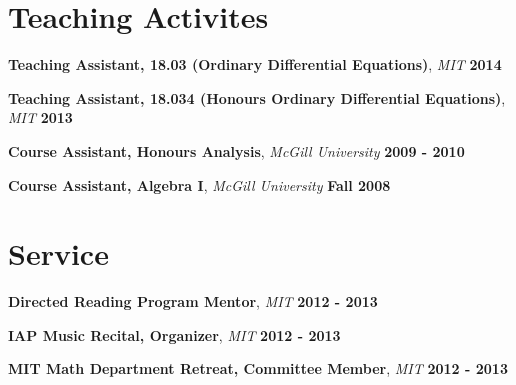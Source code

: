 \documentclass[margin,line]{resume}
\begin{document}
\begin{resume}
      
         \section{\mysidestyle Teaching Activites}
 \textbf{Teaching Assistant, 18.03 (Ordinary Differential Equations)}, \textsl{MIT} \hfill \textbf{2014}
    
    \vspace{-2mm}
    \textbf{Teaching Assistant, 18.034 (Honours Ordinary Differential Equations)}, \textsl{MIT} \hfill \textbf{2013}
    
    \vspace{-2mm}
         \textbf{Course Assistant, Honours Analysis},     \textsl{McGill University} \hfill \textbf{2009 - 2010}

\vspace{-2mm}
\textbf{Course Assistant, Algebra I},    \textsl{McGill University}  \hfill \textbf{Fall 2008}

\vspace{2mm}


   \section{\mysidestyle Service}

    \textbf{Directed Reading Program Mentor}, \textsl{MIT} \hfill \textbf{2012 - 2013}

\vspace{-2mm}
         \textbf{IAP Music Recital, Organizer},     \textsl{MIT} \hfill \textbf{2012 - 2013}

\vspace{-2mm}
         \textbf{MIT Math Department Retreat, Committee Member},     \textsl{MIT} \hfill \textbf{2012 - 2013}
%
%






%   
%    
% 


\end{resume}
\end{document}
